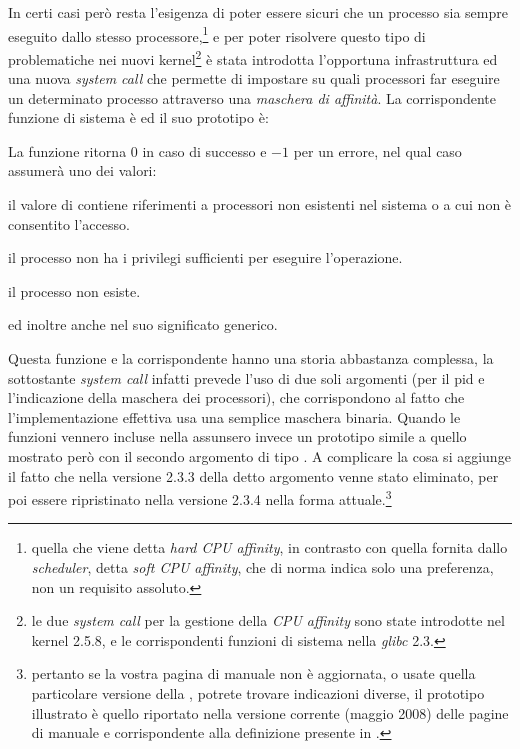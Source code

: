
In certi casi però resta l'esigenza di poter essere sicuri che un processo sia
sempre eseguito dallo stesso processore,\footnote{quella che viene detta
  \textit{hard CPU affinity}, in contrasto con quella fornita dallo
  \textit{scheduler}, detta \textit{soft CPU affinity}, che di norma indica
  solo una preferenza, non un requisito assoluto.} e per poter risolvere
questo tipo di problematiche nei nuovi kernel\footnote{le due \textit{system
    call} per la gestione della \textit{CPU affinity} sono state introdotte
  nel kernel 2.5.8, e le corrispondenti funzioni di sistema nella
  \textsl{glibc} 2.3.} è stata introdotta l'opportuna infrastruttura ed una
nuova \textit{system call} che permette di impostare su quali processori far
eseguire un determinato processo attraverso una \textsl{maschera di
  affinità}. La corrispondente funzione di sistema è
 ed il suo prototipo è:


\begin{funcproto}{ 
}
{La funzione ritorna $0$ in caso di successo e $-1$ per un errore, nel qual
caso  assumerà uno dei valori:
\begin{errlist}
\item[\errcode{EINVAL}] il valore di  contiene riferimenti a
  processori non esistenti nel sistema o a cui non è consentito l'accesso.
\item[\errcode{EPERM}] il processo non ha i privilegi sufficienti per
  eseguire l'operazione.
\item[\errcode{ESRCH}] il processo  non esiste.
\end{errlist}
ed inoltre anche  nel suo significato generico.}
\end{funcproto}

Questa funzione e la corrispondente  hanno una storia
abbastanza complessa, la sottostante \textit{system call} infatti prevede
l'uso di due soli argomenti (per il pid e l'indicazione della maschera dei
processori), che corrispondono al fatto che l'implementazione effettiva usa
una semplice maschera binaria. Quando le funzioni vennero incluse nella
 assunsero invece un prototipo simile a quello mostrato però con il
secondo argomento di tipo . A complicare la cosa si
aggiunge il fatto che nella versione 2.3.3 della  detto argomento
venne stato eliminato, per poi essere ripristinato nella versione 2.3.4 nella
forma attuale.\footnote{pertanto se la vostra pagina di manuale non è
  aggiornata, o usate quella particolare versione della , potrete
  trovare indicazioni diverse, il prototipo illustrato è quello riportato
  nella versione corrente (maggio 2008) delle pagine di manuale e
  corrispondente alla definizione presente in .}

